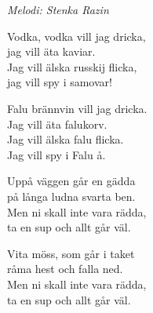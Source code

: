 {\footnotesize\textit{Melodi: Stenka Razin}}\par
\vspace{10pt}
Vodka, vodka vill jag dricka,\\
jag vill äta kaviar.\\
\revrpt Jag vill älska russkij flicka,\\
jag vill spy i samovar!\rpt\par
\vspace{10pt}
Falu brännvin vill jag dricka.\\
Jag vill äta falukorv.\\
\revrpt Jag vill älska falu flicka.\\
Jag vill spy i Falu å.\rpt\par
\vspace{10pt}
Uppå väggen går en gädda\\
på långa ludna svarta ben.\\
\revrpt Men ni skall inte vara rädda,\\
ta en sup och allt går väl.\rpt\par
\vspace{10pt}
Vita möss, som går i taket\\
råma hest och falla ned.\\
\revrpt Men ni skall inte vara rädda,\\
ta en sup och allt går väl.\rpt

